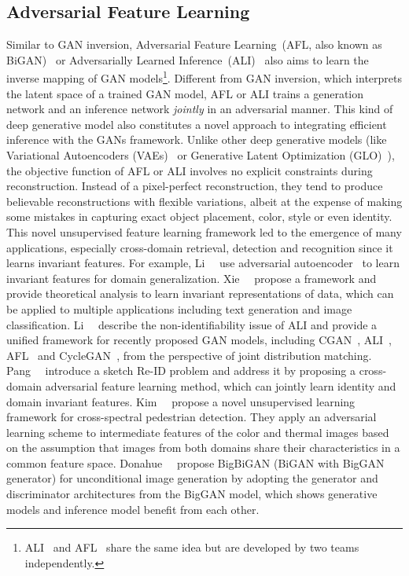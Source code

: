 \subsection{Adversarial Feature Learning}
\label{sec:afl}
Similar to GAN inversion, Adversarial Feature Learning~(AFL, also known as BiGAN)~\cite{donahue2016adversarial,li2018domain,xie2017controllable}  or Adversarially Learned Inference~(ALI)~\cite{dumoulin2016adversarially, du2018multi, belghazi2018hierarchical} also aims to learn the inverse mapping of GAN models\footnote{ALI~\cite{dumoulin2016adversarially} and AFL~\cite{donahue2016adversarial} share the same idea but are developed by two teams independently.}. Different from GAN inversion, which interprets the latent space of a trained GAN model, AFL or ALI trains a generation network and an inference network \emph{jointly} in an adversarial manner. This kind of deep generative model also constitutes a novel approach to integrating efficient inference with the GANs framework. Unlike other deep generative models (like Variational Autoencoders (VAEs)~\cite{doersch2016vae} or Generative Latent Optimization (GLO)~\cite{bojanowski2017optimizing}), the objective function of AFL or ALI involves no explicit constraints during reconstruction. 
Instead of a pixel-perfect reconstruction, they tend to produce believable reconstructions with flexible variations, albeit at the expense of making some mistakes in capturing exact object placement, color, style or even identity. 
This novel unsupervised feature learning framework led to the emergence of many applications, especially cross-domain retrieval, detection and recognition since it learns invariant features.
For example, Li~\etal~\cite{li2018domain} use adversarial autoencoder~\cite{makhzani2015aae} to learn invariant features for domain generalization. 
Xie~\etal~\cite{xie2017controllable} propose a framework and provide theoretical analysis to learn invariant representations of data, which can be applied to multiple applications including text generation and image classification.
Li~\etal~\cite{li2017alice} describe the non-identifiability issue of ALI and provide a unified framework for recently proposed GAN models, including CGAN~\cite{mirza2014conditional}, ALI~\cite{dumoulin2016adversarially}, AFL~\cite{donahue2016adversarial} and  CycleGAN~\cite{zhu2017toward}, from the perspective of joint distribution matching.
Pang~\etal~\cite{pang2018reid} introduce a sketch Re-ID problem and address it by proposing a cross-domain adversarial feature learning method, which can jointly learn identity and domain invariant features.
Kim~\etal~\cite{kim2019pedestrain} propose a novel unsupervised learning framework for cross-spectral pedestrian detection. They apply an adversarial learning scheme to intermediate features of the color and thermal images based on the assumption that images from both domains share their characteristics in a common feature space.
Donahue~\etal~\cite{donahue2019large} propose BigBiGAN (BiGAN with BigGAN generator) for unconditional image generation by adopting the generator and discriminator architectures from the BigGAN model, which shows generative models and inference model benefit from each other.


